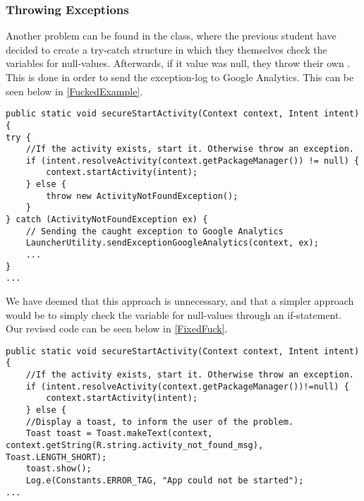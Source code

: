 \subsubsection{Throwing Exceptions}
Another problem can be found in the  class, where the
previous student have decided to create a try-catch structure in which they
themselves check the variables for null-values. Afterwards, if it value was
null, they throw their own . This is done in
order to send the exception-log to Google Analytics. This can be seen below in
\autoref{FuckedExample}.\nl

\begin{minipage}[H]{\linewidth}
\begin{lstlisting}[caption = Throwing exceptions in order to send them to Google., label = FuckedExample] 
public static void secureStartActivity(Context context, Intent intent) { 
try {
	//If the activity exists, start it. Otherwise throw an exception.
    if (intent.resolveActivity(context.getPackageManager()) != null) {
    	context.startActivity(intent);
    } else {
    	throw new ActivityNotFoundException();
    }
} catch (ActivityNotFoundException ex) {
	// Sending the caught exception to Google Analytics
    LauncherUtility.sendExceptionGoogleAnalytics(context, ex);
 	...
}
...
\end{lstlisting}
\end{minipage}

We have deemed that this approach is unnecessary, and that a simpler approach
would be to simply check the variable for null-values through an if-statement.
Our revised code can be seen below in \autoref{FixedFuck}.\nl

\begin{minipage}[H]{\linewidth}
\begin{lstlisting}[caption = Our approach without throwing exceptions., label = FixedFuck] 
public static void secureStartActivity(Context context, Intent intent) {
	//If the activity exists, start it. Otherwise throw an exception.
	if (intent.resolveActivity(context.getPackageManager())!=null) {
		context.startActivity(intent);
	} else {
	//Display a toast, to inform the user of the problem.
	Toast toast = Toast.makeText(context, context.getString(R.string.activity_not_found_msg), Toast.LENGTH_SHORT);
	toast.show(); 
	Log.e(Constants.ERROR_TAG, "App could not be started");
...
\end{lstlisting}
\end{minipage}

